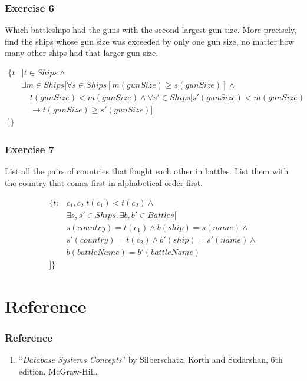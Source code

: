\documentclass{beamer}
\begin{document}
\begin{frame}[fragile]
\frametitle{Exercise 6}
Which battleships had the guns with the second largest gun size. More precisely, find the ships whose gun size was exceeded by only one gun size, no matter how many other ships had that larger gun size. 

\begin{align*}
\{t&| t\in Ships \wedge \\ 
&\exists m \in Ships \Big[\forall s\in Ships [m(gunSize)\geq s(gunSize)] \wedge  \\
& \quad t(gunSize) < m(gunSize) \wedge \forall s' \in Ships [s'(gunSize)< m(gunSize)  \\
& \quad \rightarrow t(gunSize)\geq s'(gunSize)]\\
\Big]\}
\end{align*}
\end{frame}

\begin{frame}[fragile]
\frametitle{Exercise 7}
List all the pairs of countries that fought each other in battles. List them with the country that comes first in alphabetical order first\footnotemark {}.

\begin{align*}
\{t:&c_1, c_2| t(c_1)<t(c_2) \wedge \\ 
&\exists s, s'\in Ships, \exists b, b' \in Battles \Big[\\
& s(country)=t(c_1) \wedge b(ship) =s(name) \wedge \\
& s'(country)=t(c_2) \wedge b'(ship) =s'(name) \wedge \\
& b(battleName) = b'(battleName) \\
\Big]\}
\end{align*}
\end{frame}

\section{Reference}
\begin{frame}[fragile]
\frametitle{Reference}
\begin{enumerate}
\item ``\textit{Database Systems Concepts}'' by Silberschatz, Korth and Sudarshan, 6th edition, McGraw-Hill.
\end{enumerate}
\begin{align*}

\end{align*}

\end{frame}
\end{document}

